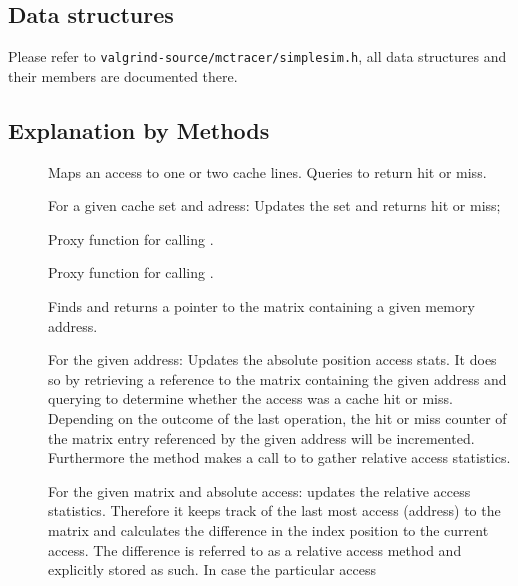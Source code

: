 \subsection{Data structures}
Please refer to \texttt{valgrind-source/mctracer/simplesim.h}, all data structures and their members are documented there.

\subsection{Explanation by Methods}

\begin{description} %
\item[] Maps an access to one or two cache lines. Queries  to return hit or miss.
\item[] For a given cache set and adress: Updates the set and returns hit or miss;
\item[] Proxy function for calling .
\item[] Proxy function for calling .
\item[] Finds and returns a pointer to the matrix containing a given memory address.
\item[] For the given address: Updates the absolute position
    access stats. It does so by retrieving a reference to the matrix containing the given address and
    querying  to determine whether the access was a cache hit or miss. Depending on the outcome
    of the last operation, the hit or miss counter of the matrix entry referenced by the given address will be incremented.
    Furthermore the method makes a call to  to gather relative access statistics.
\item[] For
    the given matrix and absolute access: updates the relative access statistics. Therefore it keeps track of the last most
    access (address) to the matrix and calculates the difference in the index position to the current access. The
    difference is referred to as a relative access method and explicitly stored as such. In case the particular access

\end{description}
